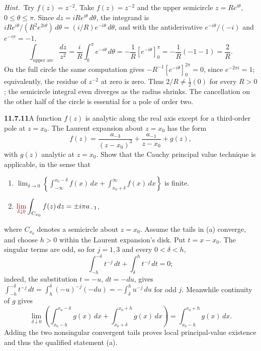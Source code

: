 \emph{Hint.}~Try $f(z)=z^{-2}$.
\solution
{}
Take $f(z)=z^{-2}$ and the upper semicircle $z=Re^{i\theta}$,
$0\le\theta\le\pi$. Since $dz=iRe^{i\theta}\,d\theta$, the integrand
is $iRe^{i\theta}/(R^2e^{2i\theta})\,d\theta=(i/R)e^{-i\theta}\,d\theta$,
and with the antiderivative $e^{-i\theta}/(-i)$ and $e^{-i\pi}=-1$,
\[
\int_{\text{upper arc}}\frac{dz}{z^2}
=\frac iR\int_0^\pi e^{-i\theta}\,d\theta
=-\frac1R[e^{-i\theta}]_0^\pi=-\frac1R(-1-1)=\frac2R.
\]
On the full circle the same computation gives
$-R^{-1}[e^{-i\theta}]_0^{2\pi}=0$, since $e^{-2\pi i}=1$; equivalently,
the residue of $z^{-2}$ at zero is zero.
Thus $2/R\ne\frac12(0)$ for every $R>0$; the semicircle integral
even diverges as the radius shrinks. The cancellation on the other
half of the circle is essential for a pole of order two.

\par\bigskip
\noindent\textbf{11.7.11}\quad A function $f(z)$ is analytic along the real
axis except for a third-order pole at $z=x_{0}$. The Laurent expansion about
$z=x_{0}$ has the form
\[
f(z)=\frac{a_{-3}}{(z-x_{0})^{3}}+\frac{a_{-1}}{z-x_{0}}+g(z),
\]
with $g(z)$ analytic at $z=x_{0}$.  Show that the Cauchy principal value
technique is applicable, in the sense that
\begin{enumerate}
\item[(a)] $\displaystyle\lim_{\delta\to0}
  \left\{\int_{-\infty}^{x_{0}-\delta}f(x)\,dx
  +\int_{x_{0}+\delta}^{\infty}f(x)\,dx\right\}$ is finite.
\item[(b)] $\displaystyle\erratum{\lim_{\delta\downarrow0}}\int_{C_{x_{0}}}f(z)\,dz=\pm i\pi a_{-1}$,
\end{enumerate}
where $C_{x_{0}}$ denotes a semicircle  about $z=x_{0}$.
\solution
{}
Assume the tails in (a) converge, and choose $h>0$ within the Laurent
expansion's disk. Put $t=x-x_0$. The singular terms are odd, so for
$j=1,3$ and every $0<\delta<h$,
\[
\int_{-h}^{-\delta}t^{-j}\,dt+\int_\delta^h t^{-j}\,dt=0;
\]
indeed, the substitution $t=-u$, $dt=-du$, gives
$\int_{-h}^{-\delta}t^{-j}\,dt=\int_h^\delta(-u)^{-j}(-du)
=-\int_\delta^hu^{-j}\,du$ for odd $j$.
Meanwhile continuity of $g$ gives
\[
\lim_{\delta\downarrow0}
\left(\int_{x_0-h}^{x_0-\delta}g(x)\,dx+
\int_{x_0+\delta}^{x_0+h}g(x)\,dx\right)
=\int_{x_0-h}^{x_0+h}g(x)\,dx.
\]
Adding the two nonsingular convergent tails proves local principal-value
existence and thus the qualified statement (a).

